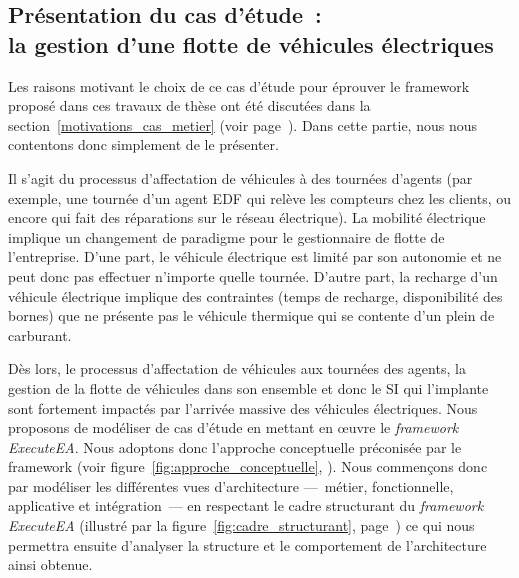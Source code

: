     \subsection{Présentation du cas d'étude~:\\la gestion d'une flotte de véhicules électriques}

    Les raisons motivant le choix de ce cas d'étude pour éprouver le framework
    proposé dans ces travaux de thèse ont été discutées dans la
    section~\ref{motivations_cas_metier} (voir
    page~\pageref{motivations_cas_metier}).  Dans cette partie, nous nous
    contentons donc simplement de le présenter.

    Il s'agit du processus d'affectation de véhicules à des tournées d'agents
    (par exemple, une tournée d'un agent EDF qui relève les compteurs chez les
    clients, ou encore qui fait des réparations sur le réseau électrique).  La
    mobilité électrique implique un changement de paradigme pour le gestionnaire
    de flotte de l'entreprise. D'une part, le véhicule électrique est limité par
    son autonomie et ne peut donc pas effectuer n'importe quelle tournée.
    D'autre part, la recharge d'un véhicule électrique implique des contraintes
    (temps de recharge, disponibilité des bornes) que ne présente pas le
    véhicule thermique qui se contente d'un plein de carburant.
    
    Dès lors, le processus d'affectation de véhicules aux tournées des agents,
    la gestion de la flotte de véhicules dans son ensemble et donc le SI qui
    l'implante sont fortement impactés par l'arrivée massive des véhicules
    électriques. Nous proposons de modéliser de cas d'étude en mettant en
    œuvre le \emph{framework ExecuteEA}. Nous adoptons donc l'approche
    conceptuelle préconisée par le framework (voir
    figure~\ref{fig:approche_conceptuelle},
    \pageref{fig:approche_conceptuelle}). Nous commençons donc par modéliser les
    différentes vues d'architecture —~métier, fonctionnelle, applicative et
    intégration~— en respectant le cadre structurant du \emph{framework
    ExecuteEA} (illustré par la figure~\ref{fig:cadre_structurant},
    page~\pageref{fig:cadre_structurant}) ce qui nous permettra ensuite
    d'analyser la structure et le comportement de l'architecture ainsi obtenue.

